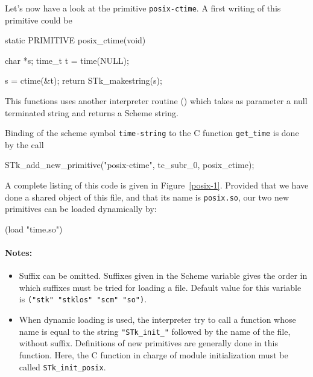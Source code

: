 \documentclass[10pt]{article}
\begin{document}
Let's now have a look at the primitive {\tt posix-ctime}. A first
writing of this primitive could be
\begin{Code}
\begin{listing}[200]{2}
static PRIMITIVE posix_ctime(void)
{
  char *s;
  time_t t = time(NULL);

  s = ctime(&t);
  return STk_makestring(s);
}
\end{listing}
\end{Code}

This functions uses another interpreter routine ()
which takes as parameter a null terminated string and returns a
Scheme string. 

Binding of the scheme symbol {\tt time-string} to the C function 
{\tt get\_time} is done by the call 
\begin{Code}
\begin{listing}[200]{2}
STk_add_new_primitive("posix-ctime", tc_subr_0, posix_ctime);
\end{listing}
\end{Code}

A complete listing of this code is given in Figure~\ref{posix-1}.
Provided that we have done a shared object of this file, and that its
name is {\tt posix.so}, our two new primitives can be loaded
dynamically by:
\begin{Code}
\begin{listing}[200]{2}
(load "time.so")
\end{listing}
\end{Code}

\paragraph*{Notes:}
\begin{itemize}
\item Suffix can be omitted. Suffixes given in the Scheme variable 
 gives the order in which suffixes must be
tried for loading a file.  Default value for this variable is
{\tt ("stk" "stklos" "scm" "so")}.

\item When dynamic loading is used, the interpreter try to call a 
function whose name is equal to the string {\tt "STk\_init\_"} followed by the
name of the file, without suffix. Definitions of new primitives are generally done
in this function. Here, the C function in charge of module initialization must
be called {\tt STk\_init\_posix}.
\end{itemize}
\end{document}
